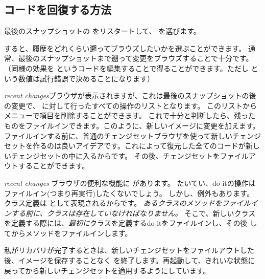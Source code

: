 \documentclass[a4paper,10pt,twoside]{book}
\begin{document}
\subsection{コードを回復する方法}
最後のスナップショットの \pharo をリスタートして、  を選びます。




すると、履歴をどれくらい遡ってブラウズしたいかを選ぶことができます。
通常、最後のスナップショットまで遡って変更をブラウズすることで十分です。（同様の効果を  というコードを編集することで得ることができます。ただし  という数値は試行錯誤で決めることになります）

\emph{recent changes}ブラウザが表示されますが、これは最後のスナップショットの後の変更で、 \pharo に対して行ったすべての操作のリストとなります。
このリストから \actclick メニューで項目を削除することができます。
これで十分と判断したら、残ったものをファイルインできます。このように、新しいイメージに変更を加えます。
ファイルインする前に、普通のチェンジセットブラウザを使って新しいチェンジセットを作るのは良いアイデアです。これによって復元した全てのコードが新しいチェンジセットの中に入るからです。
その後、チェンジセットをファイルアウトすることができます。

\emph{recent changes} ブラウザの便利な機能に  があります。
たいてい、do itの操作はファイルイン(つまり再実行)したくないでしょう。
しかし、例外もあります。
クラス定義は  として表現されるからです。
\emph{あるクラスのメソッドをファイルインする前に、クラスは存在していなければなりません。}
そこで、新しいクラスを定義する際には、\emph{最初に}クラスを定義するdo itをファイルインし、その後  してからメソッドをファイルインします。

私がリカバリが完了するときは、新しいチェンジセットをファイルアウトした後、イメージを保存することなく \pharo を終了します。再起動して、きれいな状態に戻ってから新しいチェンジセットを適用するようにしています。
\end{document}

